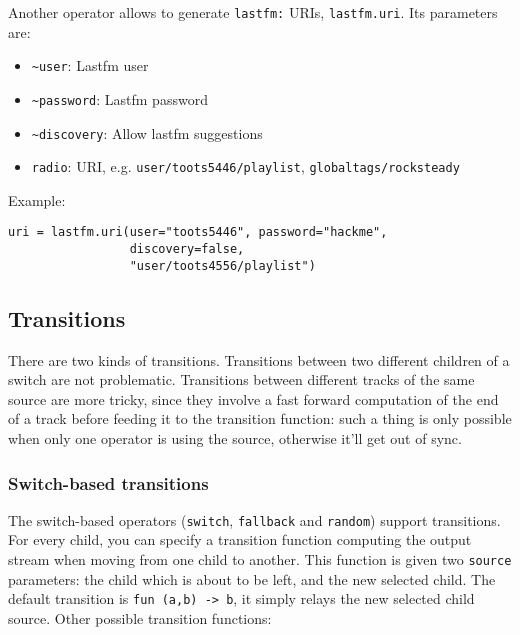 Another operator allows to generate \verb+lastfm:+ URIs, \verb+lastfm.uri+. Its parameters are:

\begin{itemize}
\item \verb+~user+: Lastfm user
\item \verb+~password+: Lastfm password
\item \verb+~discovery+: Allow lastfm suggestions
\item \verb+radio+: URI, e.g. \verb+user/toots5446/playlist+, \verb+globaltags/rocksteady+

\end{itemize}
Example:

\begin{verbatim}
uri = lastfm.uri(user="toots5446", password="hackme",
                 discovery=false,
                 "user/toots4556/playlist")
\end{verbatim}
\subsection{Transitions}
There are two kinds of transitions. Transitions between two different children of a switch are not problematic. Transitions between different tracks of the same source are more tricky, since they involve a fast forward computation of the end of a track before feeding it to the transition function: such a thing is only possible when only one operator is using the source, otherwise it'll get out of sync.

\subsubsection{Switch-based transitions}
The switch-based operators (\verb+switch+, \verb+fallback+ and \verb+random+) support transitions. For every child, you can specify a transition function computing the output stream when moving from one child to another. This function is given two \verb+source+ parameters: the child which is about to be left, and the new selected child. The default transition is \verb+fun (a,b) -> b+, it simply relays the new selected child source. Other possible transition functions:

